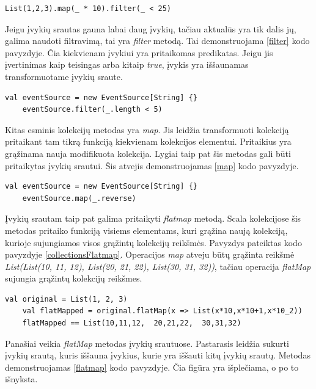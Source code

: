 \begin{lstlisting}[caption=- kolekcijos transformacijos, label=collectionTransformation]
	List(1,2,3).map(_ * 10).filter(_ < 25)
\end{lstlisting}

Jeigu įvykių srautas gauna labai daug įvykių, tačiau aktualūs yra tik dalis jų, galima naudoti filtravimą, tai yra \textit{filter} metodą. Tai demonstruojama \ref{filter} kodo pavyzdyje. Čia kiekvienam įvykiui yra pritaikomas predikatas. Jeigu jis įvertinimas kaip teisingas arba kitaip \textit{true}, įvykis yra iššaunamas transformuotame įvykių sraute.

\begin{lstlisting}[caption=- įvykių srauto filtravimas, label=filter]
	val eventSource = new EventSource[String] {}
	eventSource.filter(_.length < 5)
\end{lstlisting}

Kitas esminis kolekcijų metodas yra \textit{map}. Jis leidžia transformuoti kolekciją pritaikant tam tikrą funkciją kiekvienam kolekcijos elementui. Pritaikius yra grąžinama nauja modifikuota kolekcija. Lygiai taip pat šis metodas gali būti pritaikytas įvykių srautui. Šis atvejis demonstruojamas \ref{map} kodo pavyzdyje. 

\begin{lstlisting}[caption=- įvykių visiškas transformavimas, label=map]
	val eventSource = new EventSource[String] {}
	eventSource.map(_.reverse)
\end{lstlisting}


Įvykių srautam taip pat galima pritaikyti \textit{flatmap} metodą. Scala kolekcijose šis metodas pritaiko funkciją visiems elementams, kuri grąžina naują kolekciją, kurioje sujungiamos visos grąžintų kolekcijų reikšmės. Pavyzdys pateiktas kodo pavyzdyje \ref{collectionsFlatmap}. Operacijos \textit{map} atveju būtų grąžinta reikšmė \textit{List(List(10, 11, 12), List(20, 21, 22), List(30, 31, 32))}, tačiau operacija \textit{flatMap} sujungia grąžintų kolekcijų reikšmes. 

\begin{lstlisting}[caption=- flatmap Scala kolekcijose, label=collectionsFlatmap]
	val original = List(1, 2, 3)
	val flatMapped = original.flatMap(x => List(x*10,x*10+1,x*10_2))
	flatMapped == List(10,11,12,  20,21,22,  30,31,32) 
\end{lstlisting}

Panašiai veikia \textit{flatMap} metodas įvykių srautuose. Pastarasis leidžia sukurti įvykių srautą, kuris iššauna įvykius, kurie yra iššauti kitų įvykių srautų. Metodas demonstruojamas \ref{flatmap} kodo pavyzdyje. Čia figūra yra išplečiama, o po to išnyksta.

